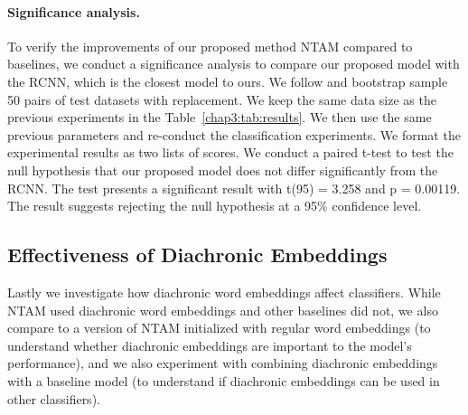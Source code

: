 \paragraph{Significance analysis.} 
To verify the improvements of our proposed method NTAM compared to baselines, we conduct a significance analysis to compare our proposed model with the RCNN, which is the closest model to ours. We follow \cite{berg2012empirical} and bootstrap sample 50 pairs of test datasets with replacement. We keep the same data size as the previous experiments in the Table~\ref{chap3:tab:results}. We then use the same previous parameters and re-conduct the classification experiments. We format the experimental results as two lists of scores. We conduct a paired t-test to test the null hypothesis that our proposed model does not differ significantly from the RCNN. The test presents a significant result with t(95) = 3.258 and p = 0.00119. The result suggests rejecting the null hypothesis at a 95\% confidence level.



\subsection{Effectiveness of Diachronic Embeddings}

Lastly we investigate how diachronic word embeddings affect classifiers.
While NTAM used diachronic word embeddings and other baselines did not,
we also compare to a version of NTAM initialized with regular word embeddings (to understand whether diachronic embeddings are important to the model's performance),
and we also experiment with combining diachronic embeddings with a baseline model (to understand if diachronic embeddings can be used in other classifiers).


